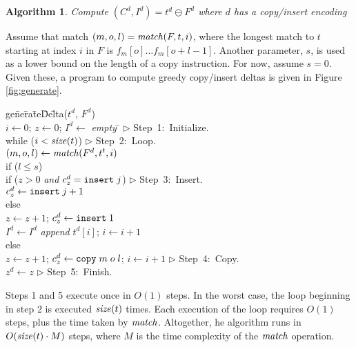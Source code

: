 \documentclass{llncs}
\newtheorem{alg}{{\sc Algorithm}}
\begin{document}
\begin{alg}\label{alg:generate}
Compute $(C^d, I^d) = t^d \ominus F^d$ where $d$ has a copy/insert
encoding
\end{alg}

Assume that match $(m, o, l) = \textrm{\emph{match}} (F,t,i)$, where the longest match
to $t$ starting at index $i$ in $F$ is $f_m[o] \ldots f_m[o+l-1]$.
Another parameter, $s$, is used as a lower bound on the length of a
copy instruction.  For now, assume $s=0$.  Given these, a program to
compute greedy copy/insert deltas is given in Figure
\ref{fig:generate}.

\begin{figure*}
\begin{program}
ge\= ne\= ra\= te\= De\= lta($t^d$, $F^d$) \\
  \> $i \leftarrow 0$; $z \leftarrow 0$; $I^d \leftarrow$ \textrm{\emph{empty}} \>\>\>\> \hspace{6cm} \= $\triangleright$ \hbox{Step 1: Initialize.} \\
  \> while ($i < \textrm{\emph{size}}(t)$) \>\>\>\>\> $\triangleright$ \hbox{Step 2: Loop.} \\
  \>\> $(m,o,l) \leftarrow \textrm{\emph{match}} (F^d,t^t,i)$ \\
  \>\> if ($l \le s$) \\
  \>\>\> if ($z > 0$ \textrm{\emph{and}} $c_z^d = \texttt{insert} \; j$) \>\>\> $\triangleright$ \hbox{Step 3: Insert.} \\
  \>\>\>\> $c_z^d \leftarrow \texttt{insert} \; j+1$ \\
  \>\>\> else \\
  \>\>\>\> $z \leftarrow z + 1$; $c_z^d \leftarrow \texttt{insert} \; 1$ \\
  \>\>\> $I^d \leftarrow I^d$ \textrm{\emph{append}} $t^d[i]$; $i \leftarrow i + 1$ \\
  \>\> else \\
  \>\>\> $z \leftarrow z + 1$; $c_z^d \leftarrow \texttt{copy} \; m \; o \; l$; $i \leftarrow i + 1$  \>\>\> $\triangleright$ \hbox{Step 4: Copy.} \\
  \> $z^d \leftarrow z$ \>\>\>\>\> $\triangleright$ \hbox{Step 5: Finish.}
\end{program}
\caption{Algorithm \ref{alg:generate}}\label{fig:generate}
\end{figure*}

Steps 1 and 5 execute once in $O(1)$ steps.  In the worst case, the
loop beginning in step 2 is executed $\textrm{\emph{size}}(t)$ times.  Each execution
of the loop requires $O(1)$ steps, plus the time taken by $\textrm{\emph{match}}$.
Altogether, he algorithm runs in $O(\textrm{\emph{size}}(t) \cdot M)$ steps, where
$M$ is the time complexity of the $\textrm{\emph{match}}$ operation.
\end{document}
